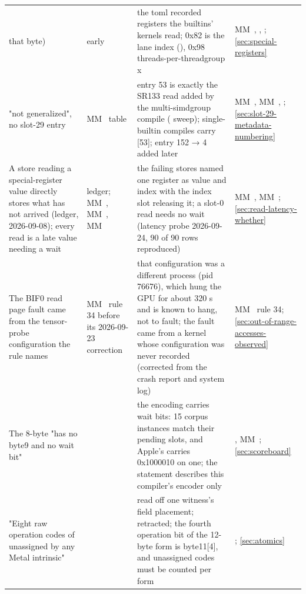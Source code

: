 \begin{xltabular}{\linewidth}{@{}>{\hsize}X>{\hsize}X>{\hsize}X>{\hsize}X@{}}
that byte) & early  & the toml recorded registers the builtins' kernels read;
0x82 is the lane index (), 0x98 threads-per-threadgroup x & MM~, ,
; \cref{sec:special-registers} \\
 "not generalized", no slot-29 entry & MM~ table & entry 53 is exactly the SR133 read added by the multi-simdgroup compile
( sweep); single-builtin compiles carry
{[}53{]}; entry 152 → 4 added later & MM~, MM~, ; 
\cref{sec:slot-29-metadata-numbering} \\
A store reading a special-register value directly stores what has not
arrived (ledger, 2026-09-08); every read is a late value needing a wait & ledger; MM~, MM~, MM~ & the failing stores named one register as value and index with the index
slot releasing it; a slot-0 read needs no wait (latency probe
2026-09-24, 90 of 90 rows reproduced) & MM~, MM~; \cref{sec:read-latency-whether} \\
The BIF0 read page fault came from the tensor-probe configuration the
rule names & MM~ rule 34 before its 2026-09-23 correction & that configuration was a different process (pid 76676), which hung the
GPU for about 320 s and is known to hang, not to fault; the fault came
from a  kernel whose configuration was never
recorded (corrected from the crash report and system log) & MM~ rule 34; \cref{sec:out-of-range-accesses-observed} \\
The 8-byte  "has no byte9 and no wait
bit" &  & the encoding carries wait bits: 15 corpus instances match their pending
slots, and Apple's  carries 0x1000010
on one; the statement describes this compiler's encoder
only & , MM~; 
\cref{sec:scoreboard} \\
"Eight raw operation codes of  unassigned by any Metal intrinsic" &  & read off one witness's field placement; retracted; the
fourth operation bit of the 12-byte form is byte11{[}4{]}, and
unassigned codes must be counted per form & ; \cref{sec:atomics} \\
\bottomrule
\end{xltabular}

